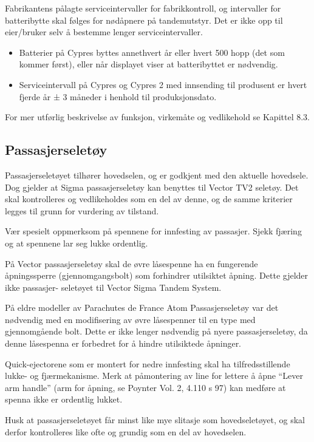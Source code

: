 Fabrikantens pålagte serviceintervaller for fabrikkontroll, og intervaller for batteribytte skal følges for nødåpnere på tandemutstyr. Det er ikke opp til eier/bruker selv å bestemme lenger serviceintervaller.
\begin{itemize}
	\item Batterier på Cypres byttes annethvert år eller hvert 500 hopp (det som kommer først), eller når displayet viser at batteribyttet er nødvendig.
	\item Serviceintervall på Cypres og Cypres 2 med innsending til produsent er hvert fjerde år ± 3 måneder i henhold til produksjonsdato.
\end{itemize}

For mer utførlig beskrivelse av funksjon, virkemåte og vedlikehold se Kapittel 8.3.

\subsection{Passasjerseletøy}
Passasjerseletøyet tilhører hovedselen, og er godkjent med den aktuelle hovedsele. Dog gjelder at Sigma passasjerseletøy kan benyttes til Vector TV2 seletøy. Det skal kontrolleres og vedlikeholdes som en del av denne, og de samme kriterier legges til grunn for vurdering av tilstand.

Vær spesielt oppmerksom på spennene for innfesting av passasjer. Sjekk fjæring og at spennene lar seg lukke ordentlig.

På Vector passasjerseletøy skal de øvre låsespenne ha en fungerende åpningssperre (gjennomgangsbolt) som forhindrer utilsiktet åpning. Dette gjelder ikke passasjer- seletøyet til Vector Sigma Tandem System.

På eldre modeller av Parachutes de France Atom Passasjerseletøy var det nødvendig med en modifisering av øvre låsespenner til en type med gjennomgående bolt. Dette er ikke lenger nødvendig på nyere passasjerseletøy, da denne låsespenna er forbedret for å hindre utilsiktede åpninger.

Quick-ejectorene som er montert for nedre innfesting skal ha tilfredsstillende lukke- og fjærmekanisme. Merk at påmontering av line for lettere å åpne ``Lever arm handle'' (arm for åpning, se Poynter Vol. 2, 4.110 s 97) kan medføre at spenna ikke er ordentlig lukket.

Husk at passasjerseletøyet får minst like mye slitasje som hovedseletøyet, og skal derfor kontrolleres like ofte og grundig som en del av hovedselen.

